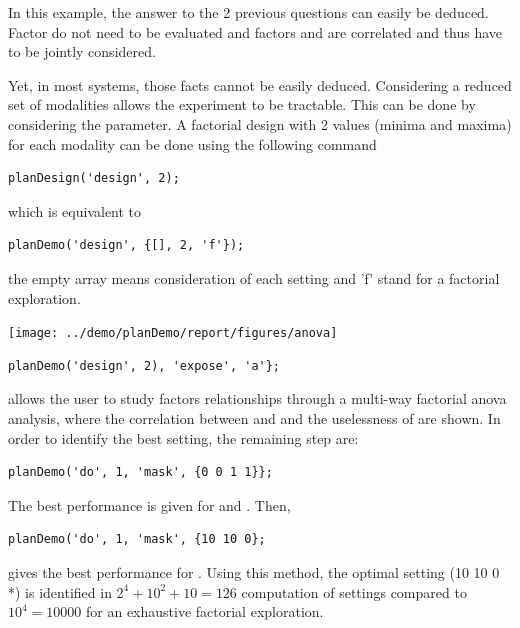 \documentclass[a4paper,fleqn]{tufte-handout}
\begin{document}


In this example, the answer  to the 2 previous questions can easily be deduced. Factor  do not need to be evaluated and factors  and  are correlated and thus have to be jointly considered.

Yet, in most systems, those facts cannot be easily deduced. Considering a reduced set of modalities allows the experiment to be tractable. This can be done by considering the  parameter. A factorial design with 2 values (minima and maxima) for each modality can be done using the following command

\begin{lstlisting}
planDesign('design', 2);
\end{lstlisting}

which is equivalent to
\begin{lstlisting}
planDemo('design', {[], 2, 'f'});
\end{lstlisting}

the empty array means consideration of each setting and 'f' stand for a factorial exploration.

\begin{marginfigure}
\texttt{[image: ../demo/planDemo/report/figures/anova]}
\end{marginfigure}

\begin{lstlisting}
planDemo('design', 2), 'expose', 'a'};
\end{lstlisting}

allows the user to study factors relationships through a multi-way factorial anova analysis, where the correlation between  and  and the uselessness of  are shown. In order to identify the best setting, the remaining step are:

\begin{lstlisting}
planDemo('do', 1, 'mask', {0 0 1 1}};
\end{lstlisting}

The best performance is given for   and  . Then,

\begin{lstlisting}
planDemo('do', 1, 'mask', {10 10 0};
\end{lstlisting}

gives the best performance for . Using this method, the optimal setting (10 10 0 *) is identified in $2^4+10^2+10 = 126$ computation of settings compared to $10^4 = 10000$ for an exhaustive factorial exploration.
\end{document}
